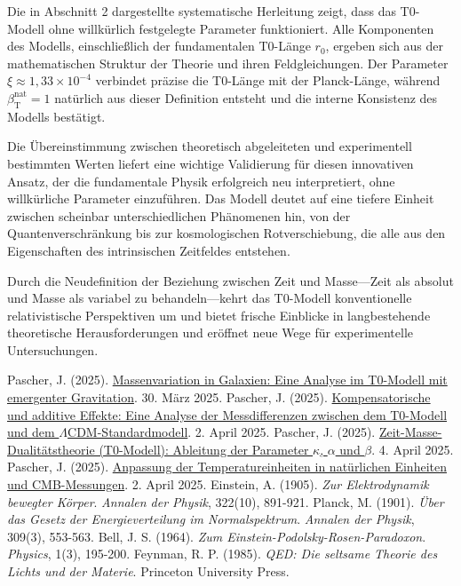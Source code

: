 \documentclass[12pt,a4paper]{article}
\newcommand{\betaT}{\beta_{\text{T}}}
\begin{document}
	Die in Abschnitt 2 dargestellte systematische Herleitung zeigt, dass das T0-Modell ohne willkürlich festgelegte Parameter funktioniert. Alle Komponenten des Modells, einschließlich der fundamentalen T0-Länge \(r_0\), ergeben sich aus der mathematischen Struktur der Theorie und ihren Feldgleichungen. Der Parameter \(\xi \approx 1,33 \times 10^{-4}\) verbindet präzise die T0-Länge mit der Planck-Länge, während \(\betaT^{\text{nat}} = 1\) natürlich aus dieser Definition entsteht und die interne Konsistenz des Modells bestätigt.
	
	Die Übereinstimmung zwischen theoretisch abgeleiteten und experimentell bestimmten Werten liefert eine wichtige Validierung für diesen innovativen Ansatz, der die fundamentale Physik erfolgreich neu interpretiert, ohne willkürliche Parameter einzuführen. Das Modell deutet auf eine tiefere Einheit zwischen scheinbar unterschiedlichen Phänomenen hin, von der Quantenverschränkung bis zur kosmologischen Rotverschiebung, die alle aus den Eigenschaften des intrinsischen Zeitfeldes entstehen.
	
	Durch die Neudefinition der Beziehung zwischen Zeit und Masse—Zeit als absolut und Masse als variabel zu behandeln—kehrt das T0-Modell konventionelle relativistische Perspektiven um und bietet frische Einblicke in langbestehende theoretische Herausforderungen und eröffnet neue Wege für experimentelle Untersuchungen.
	
	\begin{thebibliography}{99}
		 Pascher, J. (2025). \href{https://github.com/jpascher/T0-Time-Mass-Duality/tree/main/2/pdf/Deutsch/MassVarGalaxien.pdf}{Massenvariation in Galaxien: Eine Analyse im T0-Modell mit emergenter Gravitation}. 30. März 2025.
		 Pascher, J. (2025). \href{https://github.com/jpascher/T0-Time-Mass-Duality/tree/main/2/pdf/Deutsch/MessdifferenzenT0Standard.pdf}{Kompensatorische und additive Effekte: Eine Analyse der Messdifferenzen zwischen dem T0-Modell und dem \(\Lambda\)CDM-Standardmodell}. 2. April 2025.
		 Pascher, J. (2025). \href{https://github.com/jpascher/T0-Time-Mass-Duality/tree/main/2/pdf/Deutsch/ZeitMasseT0Params.pdf}{Zeit-Masse-Dualitätstheorie (T0-Modell): Ableitung der Parameter \(\kappa\), \(\alpha\) und \(\beta\)}. 4. April 2025.
		 Pascher, J. (2025). \href{https://github.com/jpascher/T0-Time-Mass-Duality/tree/main/2/pdf/Deutsch/NatEinheitenAlpha1.pdf}{Anpassung der Temperatureinheiten in natürlichen Einheiten und CMB-Messungen}. 2. April 2025.
		 Einstein, A. (1905). \textit{Zur Elektrodynamik bewegter Körper}. \textit{Annalen der Physik}, 322(10), 891-921.
		 Planck, M. (1901). \textit{Über das Gesetz der Energieverteilung im Normalspektrum}. \textit{Annalen der Physik}, 309(3), 553-563.
		 Bell, J. S. (1964). \textit{Zum Einstein-Podolsky-Rosen-Paradoxon}. \textit{Physics}, 1(3), 195-200.
		 Feynman, R. P. (1985). \textit{QED: Die seltsame Theorie des Lichts und der Materie}. Princeton University Press.
	\end{thebibliography}
	
\end{document}

